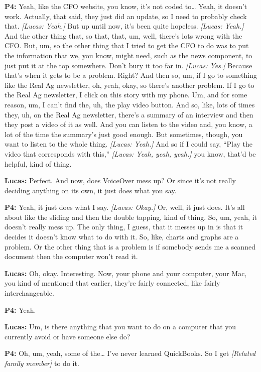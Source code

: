 \textbf{P4:} Yeah, like the CFO website, you know, it's not coded to\ldots{} Yeah, it doesn't work. Actually, that said, they just did an update, so I need to probably check that. \textit{[Lucas: Yeah.]} But up until now, it's been quite hopeless. \textit{[Lucas: Yeah.]} And the other thing that, so that, that, um, well, there's lots wrong with the CFO. But, um, so the other thing that I tried to get the CFO to do was to put the information that we, you know, might need, such as the news component, to just put it at the top somewhere. Don't bury it too far in. \textit{[Lucas: Yes.]} Because that's when it gets to be a problem. Right? And then so, um, if I go to something like the Real Ag newsletter, oh, yeah, okay, so there's another problem. If I go to the Real Ag newsletter, I click on this story with my phone. Um, and for some reason, um, I can't find the, uh, the play video button. And so, like, lots of times they, uh, on the Real Ag newsletter, there's a summary of an interview and then they post a video of it as well. And you can listen to the video and, you know, a lot of the time the summary's just good enough. But sometimes, though, you want to listen to the whole thing. \textit{[Lucas: Yeah.]} And so if I could say, ``Play the video that corresponds with this,'' \textit{[Lucas: Yeah, yeah, yeah.]} you know, that'd be helpful, kind of thing.

\textbf{Lucas:} Perfect. And now, does VoiceOver mess up? Or since it's not really deciding anything on its own, it just does what you say.

\textbf{P4:} Yeah, it just does what I say. \textit{[Lucas: Okay.]} Or, well, it just does. It's all about like the sliding and then the double tapping, kind of thing. So, um, yeah, it doesn't really mess up. The only thing, I guess, that it messes up in is that it decides it doesn't know what to do with it. So, like, charts and graphs are a problem. Or the other thing that is a problem is if somebody sends me a scanned document then the computer won't read it.

\textbf{Lucas:} Oh, okay. Interesting. Now, your phone and your computer, your Mac, you kind of mentioned that earlier, they're fairly connected, like fairly interchangeable.

\textbf{P4:} Yeah.

\textbf{Lucas:} Um, is there anything that you want to do on a computer that you currently avoid or have someone else do?

\textbf{P4:} Oh, um, yeah, some of the\ldots{} I've never learned QuickBooks. So I get \textit{[Related family member]} to do it.

